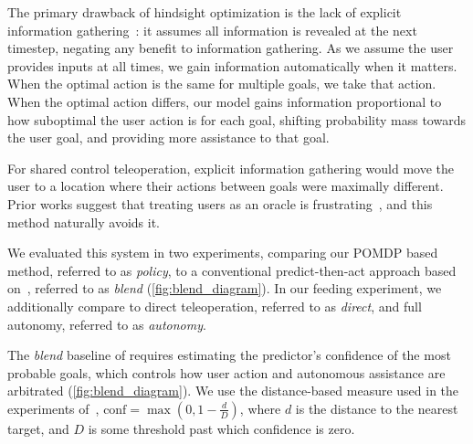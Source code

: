 The primary drawback of hindsight optimization is the lack of explicit information gathering~\citep{littman_1995}: it assumes all information is revealed at the next timestep, negating any benefit to information gathering. As we assume the user provides inputs at all times, we gain information automatically when it matters. When the optimal action is the same for multiple goals, we take that action. When the optimal action differs, our model gains information proportional to how suboptimal the user action is for each goal, shifting probability mass towards the user goal, and providing more assistance to that goal.

For shared control teleoperation, explicit information gathering would move the user to a location where their actions between goals were maximally different. Prior works suggest that treating users as an oracle is frustrating~\citep{guillory_2011_noise, amershi_2014}, and this method naturally avoids it.


We evaluated this system in two experiments, comparing our POMDP based method, referred to as \emph{policy}, to a conventional predict-then-act approach based on~\citet{dragan_2013_assistive}, referred to as \emph{blend} (\cref{fig:blend_diagram}). In our feeding experiment, we additionally compare to direct teleoperation, referred to as \emph{direct}, and full autonomy, referred to as \emph{autonomy}.

The \emph{blend} baseline of \citet{dragan_2013_assistive} requires estimating the predictor's confidence of the most probable goals, which controls how user action and autonomous assistance are arbitrated (\cref{fig:blend_diagram}). We use the distance-based measure used in the experiments of~\citet{dragan_2013_assistive}, $\text{conf} = \max\left(0, 1-\frac{d}{D}\right)$, where $d$ is the distance to the nearest target, and $D$ is some threshold past which confidence is zero.



%
